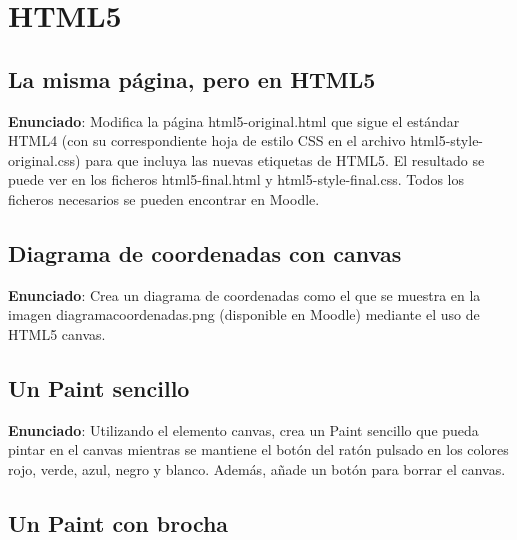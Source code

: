 \section{HTML5}

\subsection{La misma página, pero en HTML5}
\label{subsec:lo-mismo-pero-diferente}

\textbf{Enunciado}: Modifica la página html5-original.html que sigue el estándar HTML4
(con su correspondiente hoja de estilo CSS en el archivo html5-style-original.css)
para que incluya las nuevas etiquetas de HTML5. El resultado se puede ver en los
ficheros html5-final.html y html5-style-final.css. Todos los ficheros necesarios se
pueden encontrar en Moodle.

\subsection{Diagrama de coordenadas con canvas}
\label{subsec:diagrama-coordenadas}

\textbf{Enunciado}: Crea un diagrama de coordenadas como el que se muestra en la imagen diagramacoordenadas.png (disponible en Moodle) mediante el uso de HTML5 canvas.

\subsection{Un Paint sencillo}
\label{subsec:paint-sencillo}

\textbf{Enunciado}: Utilizando el elemento canvas, crea un Paint sencillo que pueda pintar en el canvas mientras se mantiene el botón del ratón pulsado en los colores rojo, verde, azul, negro y blanco. Además, añade un botón para borrar el canvas.


\subsection{Un Paint con brocha}
\label{subsec:paint-brocha}

